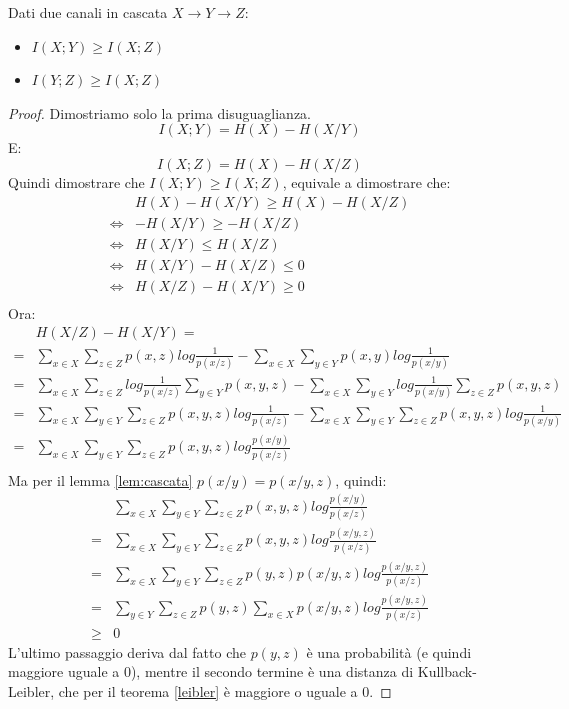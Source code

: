 \begin{teorema}
\mbox{}

Dati due canali in cascata $X \to Y \to Z$:
 \begin{itemize}
  \item $I(X;Y) \ge I(X;Z)$
  \item $I(Y;Z) \ge I(X;Z)$
 \end{itemize}
\begin{proof}
 Dimostriamo solo la prima disuguaglianza.
 \[
  I(X;Y)=H(X)-H(X/Y)
 \]
 E:
 \[
  I(X;Z)=H(X)-H(X/Z)
 \]
 Quindi dimostrare che $I(X;Y) \ge I(X;Z)$, equivale a dimostrare che:
 \[\begin{split}
  & H(X)-H(X/Y) \ge H(X)-H(X/Z) \\
  \iff & -H(X/Y) \ge -H(X/Z) \\
  \iff & H(X/Y) \le H(X/Z) \\
  \iff & H(X/Y)-H(X/Z) \le 0 \\
  \iff & H(X/Z)-H(X/Y) \ge 0 \\
   \end{split}
 \]
Ora:
\[\begin{split}
  & H(X/Z)-H(X/Y)= \\
 =&\sum_{x \in X} \sum_{z \in Z} p(x,z) log \frac{1}{p(x/z)} - \sum_{x \in X} \sum_{y \in Y} p(x,y) log \frac{1}{p(x/y)} \\
 =&\sum_{x \in X} \sum_{z \in Z} log \frac{1}{p(x/z)}  \sum_{y \in Y} p(x,y,z) 
  - \sum_{x \in X} \sum_{y \in Y} log \frac{1}{p(x/y)} \sum_{z \in Z} p(x,y,z) \\
 =&\sum_{x \in X} \sum_{y \in Y} \sum_{z \in Z} p(x,y,z) log \frac{1}{p(x/z)} 
  - \sum_{x \in X} \sum_{y \in Y} \sum_{z \in Z} p(x,y,z) log \frac{1}{p(x/y)} \\
 =&\sum_{x \in X} \sum_{y \in Y} \sum_{z \in Z} p(x,y,z) log \frac{p(x/y)}{p(x/z)} \\
  \end{split}
\]
Ma per il lemma \ref{lem:cascata} $p(x/y)=p(x/y,z)$, quindi:
\[\begin{split}
  &\sum_{x \in X} \sum_{y \in Y} \sum_{z \in Z} p(x,y,z) log \frac{p(x/y)}{p(x/z)} \\
 =&\sum_{x \in X} \sum_{y \in Y} \sum_{z \in Z} p(x,y,z) log \frac{p(x/y,z)}{p(x/z)} \\
 =&\sum_{x \in X} \sum_{y \in Y} \sum_{z \in Z} p(y,z) p(x/y,z) log \frac{p(x/y,z)}{p(x/z)} \\
 =&\sum_{y \in Y} \sum_{z \in Z} p(y,z) \sum_{x \in X} p(x/y,z) log \frac{p(x/y,z)}{p(x/z)} \\
 \ge & 0
 \end{split}
\]
L'ultimo passaggio deriva dal fatto che $p(y,z)$ è una probabilità (e quindi maggiore uguale a 0), mentre il 
secondo termine è una distanza di Kullback-Leibler, che per il teorema \ref{leibler} è maggiore o uguale a 0.
\end{proof}
\end{teorema}

